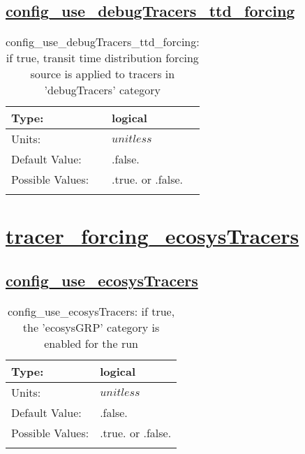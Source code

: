 \subsection[config\_use\_debugTracers\_ttd\_forcing]{\hyperref[sec:nm_tab_tracer_forcing_debugTracers]{config\_use\_debugTracers\_ttd\_forcing}}
\label{subsec:nm_sec_config_use_debugTracers_ttd_forcing}
\begin{center}
\begin{longtable}{| p{2.0in} || p{4.0in} |}
    \hline
    Type: & logical \\
    \hline
    Units: & $unitless$ \\
    \hline
    Default Value: & .false. \\
    \hline
    Possible Values: & .true. or .false. \\
    \hline
    \caption{config\_use\_debugTracers\_ttd\_forcing: if true, transit time distribution forcing source is applied to tracers in 'debugTracers' category}
\end{longtable}
\end{center}
\section[tracer\_forcing\_ecosysTracers]{\hyperref[sec:nm_tab_tracer_forcing_ecosysTracers]{tracer\_forcing\_ecosysTracers}}
\label{sec:nm_sec_tracer_forcing_ecosysTracers}
\subsection[config\_use\_ecosysTracers]{\hyperref[sec:nm_tab_tracer_forcing_ecosysTracers]{config\_use\_ecosysTracers}}
\label{subsec:nm_sec_config_use_ecosysTracers}
\begin{center}
\begin{longtable}{| p{2.0in} || p{4.0in} |}
    \hline
    Type: & logical \\
    \hline
    Units: & $unitless$ \\
    \hline
    Default Value: & .false. \\
    \hline
    Possible Values: & .true. or .false. \\
    \hline
    \caption{config\_use\_ecosysTracers: if true, the 'ecosysGRP' category is enabled for the run}
\end{longtable}
\end{center}
